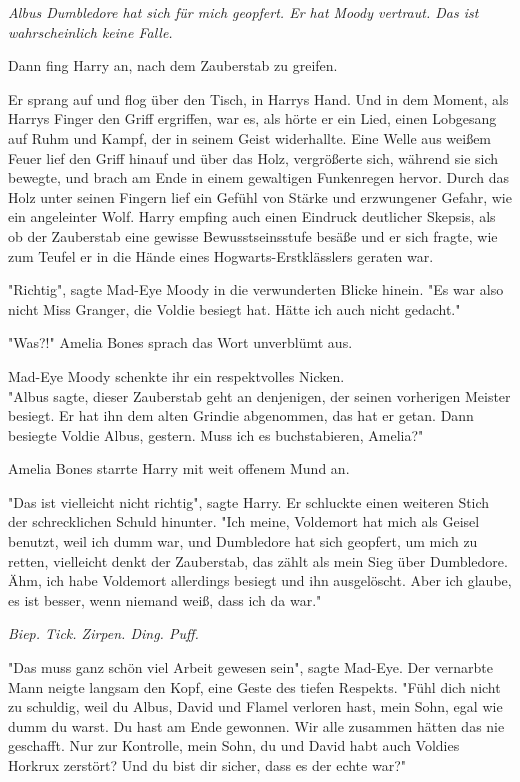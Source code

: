 {\emph{Albus Dumbledore hat sich für mich geopfert. Er hat Moody vertraut. Das ist wahrscheinlich keine Falle.}

Dann fing Harry an, nach dem Zauberstab zu greifen.

Er sprang auf und flog über den Tisch, in Harrys Hand. Und in dem Moment, als Harrys Finger den Griff ergriffen, war es, als hörte er ein Lied, einen Lobgesang auf Ruhm und Kampf, der in seinem Geist widerhallte. Eine Welle aus weißem Feuer lief den Griff hinauf und über das Holz, vergrößerte sich, während sie sich bewegte, und brach am Ende in einem gewaltigen Funkenregen hervor. Durch das Holz unter seinen Fingern lief ein Gefühl von Stärke und erzwungener Gefahr, wie ein angeleinter Wolf. Harry empfing auch einen Eindruck deutlicher Skepsis, als ob der Zauberstab eine gewisse Bewusstseinsstufe besäße und er sich fragte, wie zum Teufel er in die Hände eines Hogwarts-Erstklässlers geraten war.

"Richtig", sagte Mad-Eye Moody in die verwunderten Blicke hinein. "Es war also nicht Miss Granger, die Voldie besiegt hat. Hätte ich auch nicht gedacht."

"Was?!" Amelia Bones sprach das Wort unverblümt aus.

Mad-Eye Moody schenkte ihr ein respektvolles Nicken.\\ "Albus sagte, dieser Zauberstab geht an denjenigen, der seinen vorherigen Meister besiegt. Er hat ihn dem alten Grindie abgenommen, das hat er getan. Dann besiegte Voldie Albus, gestern. Muss ich es buchstabieren, Amelia?"

Amelia Bones starrte Harry mit weit offenem Mund an.

"Das ist vielleicht nicht richtig", sagte Harry. Er schluckte einen weiteren Stich der schrecklichen Schuld hinunter. "Ich meine, Voldemort hat mich als Geisel benutzt, weil ich dumm war, und Dumbledore hat sich geopfert, um mich zu retten, vielleicht denkt der Zauberstab, das zählt als mein Sieg über Dumbledore. Ähm, ich habe Voldemort allerdings besiegt und ihn ausgelöscht. Aber ich glaube, es ist besser, wenn niemand weiß, dass ich da war."

\emph{Biep. Tick. Zirpen. Ding. Puff.}

"Das muss ganz schön viel Arbeit gewesen sein", sagte Mad-Eye. Der vernarbte Mann neigte langsam den Kopf, eine Geste des tiefen Respekts. "Fühl dich nicht zu schuldig, weil du Albus, David und Flamel verloren hast, mein Sohn, egal wie dumm du warst. Du hast am Ende gewonnen. Wir alle zusammen hätten das nie geschafft. Nur zur Kontrolle, mein Sohn, du und David habt auch Voldies Horkrux zerstört? Und du bist dir sicher, dass es der echte war?"

}
